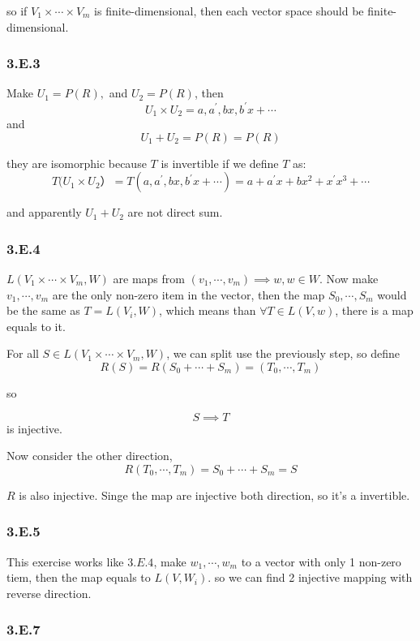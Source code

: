 so if $V_{1} \times \cdots \times V_{m}$ is finite-dimensional, then each vector space should be finite-dimensional.

\subsubsection*{3.E.3}

Make $U_{1} = P(R), $ and $U_{2} = P(R)$, then 
\[U_{1} \times U_{2} = a, a^{'}, bx, b^{'}x + \cdots \]
and 
\[U_{1} + U_{2} = P(R) = P(R)\]

they are isomorphic because $T$ is invertible if we define $T$ as:
\[T(U_{1} \times U_{2}） = T(a, a^{'}, bx, b^{'}x + \cdots) = a + a^{'}x + bx^{2} + x^{'}x^{3} + \cdots\]

and apparently $U_{1}+U_{2}$ are not direct sum.

\subsubsection*{3.E.4}

$L(V_{1}\times \cdots \times V_{m}, W)$ are maps from $(v_{1}, \cdots, v_{m}) \implies w, w\in W$. Now make $v_{1}, \cdots, v_{m}$ are the only non-zero item in the vector, then the map $S_{0}, \cdots, S_{m}$ would be the same as $T = L(V_{i}, W)$, which means than $\forall T\in L(V, w)$, there is a map equals to it.

For all $S \in L(V_{1}\times \cdots \times V_{m}, W)$, we can split use the previously step, so define
\[R(S) = R(S_{0} + \cdots + S_{m}) = (T_{0} , \cdots , T_{m}) \]

so 

\[S\implies T\] is injective.

Now consider the other direction, 
\[R(T_{0} , \cdots , T_{m}) = S_{0} + \cdots + S_{m} = S\]

$R$ is also injective. Singe the map are injective both direction, so it's a invertible.

\subsubsection*{3.E.5}

This exercise works like $3.E.4$, make $w_{1}, \cdots, w_{m}$ to a vector with only 1 non-zero tiem, then the map equals to $L(V, W_{i})$. so we can find 2 injective mapping with reverse direction.

\subsubsection*{3.E.7}

